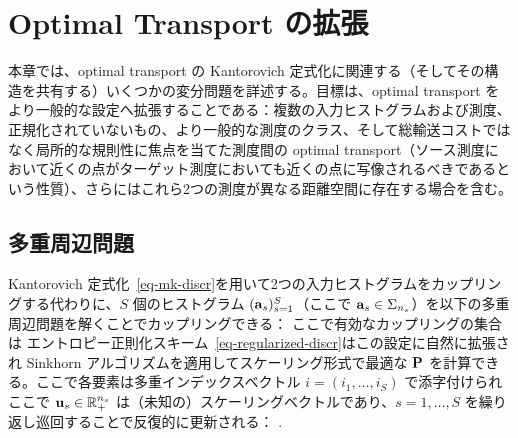 \chapter{Optimal Transport の拡張}
\label{c-extensions}

本章では、optimal transport の Kantorovich 定式化に関連する（そしてその構造を共有する）いくつかの変分問題を詳述する。目標は、optimal transport をより一般的な設定へ拡張することである：複数の入力ヒストグラムおよび測度、正規化されていないもの、より一般的な測度のクラス、そして総輸送コストではなく局所的な規則性に焦点を当てた測度間の optimal transport（ソース測度において近くの点がターゲット測度においても近くの点に写像されるべきであるという性質）、さらにはこれら2つの測度が異なる距離空間に存在する場合を含む。

\section{多重周辺問題}
\label{sec-multimarginal}

Kantorovich 定式化~\eqref{eq-mk-discr}を用いて2つの入力ヒストグラムをカップリングする代わりに、$S$ 個のヒストグラム $(\a_s)_{s=1}^S$（ここで $\a_s \in \simplex_{n_s}$）を以下の多重周辺問題を解くことでカップリングできる：
ここで有効なカップリングの集合は
エントロピー正則化スキーム~\eqref{eq-regularized-discr}はこの設定に自然に拡張され
Sinkhorn アルゴリズムを適用してスケーリング形式で最適な $\P$ を計算できる。ここで各要素は多重インデックスベクトル $i=(i_1,\ldots,i_S)$ で添字付けられ
ここで $\uD_s \in \RR_+^{n_s}$ は（未知の）スケーリングベクトルであり、$s=1,\ldots,S$ を繰り返し巡回することで反復的に更新される：
.


